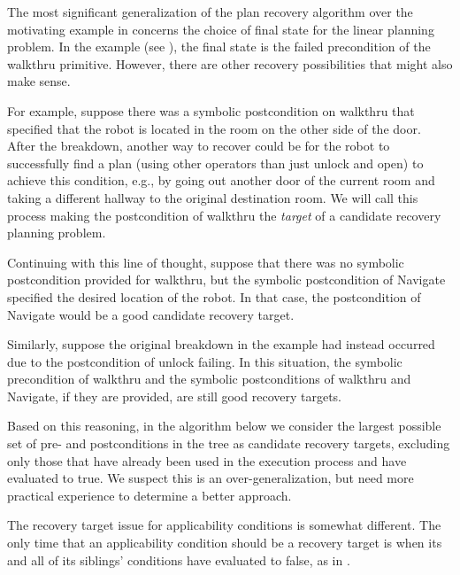\documentclass{llncs}
\begin{document}

\noindent The most significant generalization of the plan recovery
algorithm over the motivating example in  concerns
the choice of final state for the linear planning problem.  In the
example (see ), the final state is the failed
precondition of the walkthru primitive.  However, there are other
recovery possibilities that might also make sense.  

For example, suppose there was a symbolic postcondition on walkthru
that specified that the robot is located in the room on the other side
of the door.  After the breakdown, another way to recover could be for
the robot to successfully find a plan (using other operators than just
unlock and open) to achieve this condition, e.g., by going out another
door of the current room and taking a different hallway to the
original destination room.  We will call this process making the
postcondition of walkthru the {\em target} of a candidate recovery
planning problem.

Continuing with this line of thought, suppose that there was no
symbolic postcondition provided for walkthru, but the symbolic
postcondition of Navigate specified the desired location of the robot.
In that case, the postcondition of Navigate would be a good candidate
recovery target.

Similarly, suppose the original breakdown in the example had instead
occurred due to the postcondition of unlock failing.  In this
situation, the symbolic precondition of walkthru and the symbolic
postconditions of walkthru and Navigate, if they are provided, are
still good recovery targets.

Based on this reasoning, in the algorithm below we consider the
largest possible set of pre- and postconditions in the tree as
candidate recovery targets, excluding only those that have already
been used in the execution process and have evaluated to true.  We
suspect this is an over-generalization, but need more practical
experience to determine a better approach.

The recovery target issue for applicability conditions is
somewhat different.  The only time that an applicability
condition should be a recovery target is when its and all of its
siblings' conditions have evaluated to false, as in
.
	
\end{document}
